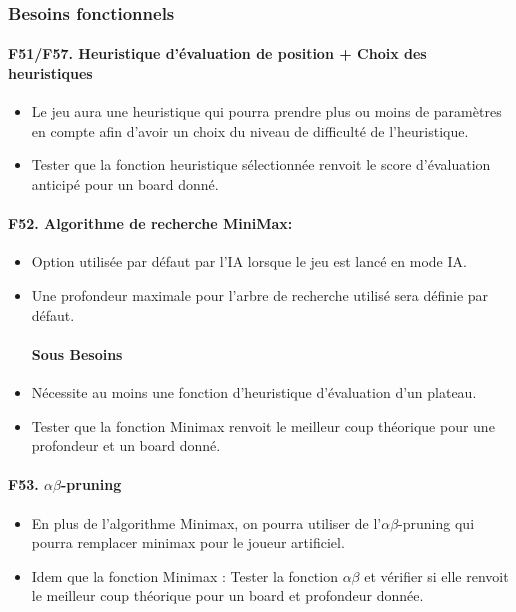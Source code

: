 \documentclass[a4paper,12pt]{article}
\begin{document}
\subsubsection{Besoins fonctionnels}

\paragraph{F51/F57. Heuristique d'évaluation de position + Choix des heuristiques}
\begin{itemize}
  \item Le jeu aura une heuristique qui pourra prendre plus ou moins de paramètres en
        compte afin d'avoir un choix du niveau de difficulté de l'heuristique.
  \item Tester que la fonction heuristique sélectionnée renvoit le score d'évaluation
        anticipé pour un board donné.
\end{itemize}

\paragraph{F52. Algorithme de recherche MiniMax:}
\begin{itemize}
  \item Option utilisée par défaut par l'IA lorsque le jeu est lancé en mode IA.
  \item Une profondeur maximale pour l'arbre de recherche utilisé sera définie par
        défaut.
        \paragraph{Sous Besoins}
  \item Nécessite au moins une fonction d'heuristique d'évaluation d'un plateau.
  \item Tester que la fonction Minimax renvoit le meilleur coup théorique pour une
        profondeur et un board donné.
\end{itemize}

\paragraph{F53. $\alpha\beta$-pruning}
\begin{itemize}
  \item En plus de l'algorithme Minimax, on pourra utiliser de l'$\alpha\beta$-pruning
        qui pourra remplacer minimax pour le joueur artificiel.
  \item Idem que la fonction Minimax : Tester la fonction $\alpha\beta$ et vérifier si
        elle renvoit le meilleur coup théorique pour un board et profondeur donnée.
\end{itemize}
\end{document}
